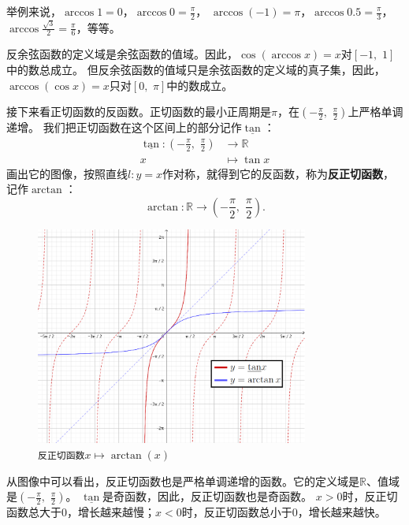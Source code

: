 \documentclass[12pt,UTF8]{ctexbook}
\begin{document}
举例来说，$\arccos{1} = 0$，$\arccos{0} = \frac{\pi}{2}$，
$\arccos{(-1)} = \pi$，$\arccos{0.5} = \frac{\pi}{3}$，$\arccos{\frac{\sqrt{3}}{2}} = \frac{\pi}{6}$，等等。

反余弦函数的定义域是余弦函数的值域。因此，$\cos{(\arccos{x})} = x$对$[-1,\,\, 1]$中的数总成立。
但反余弦函数的值域只是余弦函数的定义域的真子集，因此，$\arccos{(\cos{x})} = x$只对$[0,\,\,\pi]$中的数成立。

接下来看正切函数的反函数。正切函数的最小正周期是$\pi$，在$(-\frac{\pi}{2}, \,\, \frac{\pi}{2})$上严格单调递增。
我们把正切函数在这个区间上的部分记作$\underline{\tan}$：
\begin{align*}
    \underline{\tan} : (-\frac{\pi}{2}, \,\, \frac{\pi}{2}) &\rightarrow \mathbb{R}  \\
                                                          x &\mapsto \tan{x} 
\end{align*}
画出它的图像，按照直线$l: y = x$作对称，就得到它的反函数，称为\textbf{反正切函数}，记作$\arctan$：
$$ \arctan : \mathbb{R} \rightarrow (-\frac{\pi}{2}, \,\, \frac{\pi}{2}) . $$

\begin{figure}[h] %
    \vspace{4pt}
    \centering
    \includegraphics[width=0.8\textwidth]{tu/反正切函数1.png}
    \caption*{\texttt{反正切函数}$x\mapsto \arctan(x)$}
\end{figure}

从图像中可以看出，反正切函数也是严格单调递增的函数。它的定义域是$\mathbb{R}$、值域是$(-\frac{\pi}{2}, \,\, \frac{\pi}{2})$。
$\underline{\tan}$是奇函数，因此，反正切函数也是奇函数。
$x > 0$时，反正切函数总大于$0$，增长越来越慢；$x < 0$时，反正切函数总小于$0$，增长越来越快。
\end{document}
